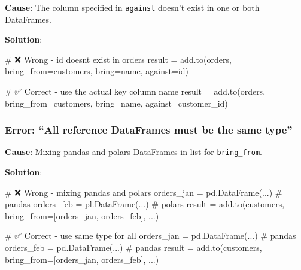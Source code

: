 \documentclass[
  letterpaper,
]{scrbook}
\newenvironment{Shaded}{\begin{snugshade}}{\end{snugshade}}
\newcommand{\CommentTok}[1]{\textcolor[rgb]{0.37,0.37,0.37}{#1}}
\newcommand{\NormalTok}[1]{\textcolor[rgb]{0.00,0.23,0.31}{#1}}
\newcommand{\OperatorTok}[1]{\textcolor[rgb]{0.37,0.37,0.37}{#1}}
\newcommand{\StringTok}[1]{\textcolor[rgb]{0.13,0.47,0.30}{#1}}
\begin{document}
\textbf{Cause}: The column specified in \texttt{against} doesn't exist
in one or both DataFrames.

\textbf{Solution}:

\begin{Shaded}
\begin{Highlighting}[]
\CommentTok{\# ❌ Wrong {-} \textquotesingle{}id\textquotesingle{} doesn\textquotesingle{}t exist in orders}
\NormalTok{result }\OperatorTok{=}\NormalTok{ add.to(orders, bring\_from}\OperatorTok{=}\NormalTok{customers, bring}\OperatorTok{=}\StringTok{\textquotesingle{}name\textquotesingle{}}\NormalTok{, against}\OperatorTok{=}\StringTok{\textquotesingle{}id\textquotesingle{}}\NormalTok{)}

\CommentTok{\# ✅ Correct {-} use the actual key column name}
\NormalTok{result }\OperatorTok{=}\NormalTok{ add.to(orders, bring\_from}\OperatorTok{=}\NormalTok{customers, bring}\OperatorTok{=}\StringTok{\textquotesingle{}name\textquotesingle{}}\NormalTok{, against}\OperatorTok{=}\StringTok{\textquotesingle{}customer\_id\textquotesingle{}}\NormalTok{)}
\end{Highlighting}
\end{Shaded}

\subsubsection{Error: ``All reference DataFrames must be the same
type''}\label{error-all-reference-dataframes-must-be-the-same-type}

\textbf{Cause}: Mixing pandas and polars DataFrames in list for
\texttt{bring\_from}.

\textbf{Solution}:

\begin{Shaded}
\begin{Highlighting}[]
\CommentTok{\# ❌ Wrong {-} mixing pandas and polars}
\NormalTok{orders\_jan }\OperatorTok{=}\NormalTok{ pd.DataFrame(...)  }\CommentTok{\# pandas}
\NormalTok{orders\_feb }\OperatorTok{=}\NormalTok{ pl.DataFrame(...)  }\CommentTok{\# polars}
\NormalTok{result }\OperatorTok{=}\NormalTok{ add.to(customers, bring\_from}\OperatorTok{=}\NormalTok{[orders\_jan, orders\_feb], ...)}

\CommentTok{\# ✅ Correct {-} use same type for all}
\NormalTok{orders\_jan }\OperatorTok{=}\NormalTok{ pd.DataFrame(...)  }\CommentTok{\# pandas}
\NormalTok{orders\_feb }\OperatorTok{=}\NormalTok{ pd.DataFrame(...)  }\CommentTok{\# pandas}
\NormalTok{result }\OperatorTok{=}\NormalTok{ add.to(customers, bring\_from}\OperatorTok{=}\NormalTok{[orders\_jan, orders\_feb], ...)}
\end{Highlighting}
\end{Shaded}
\end{document}
